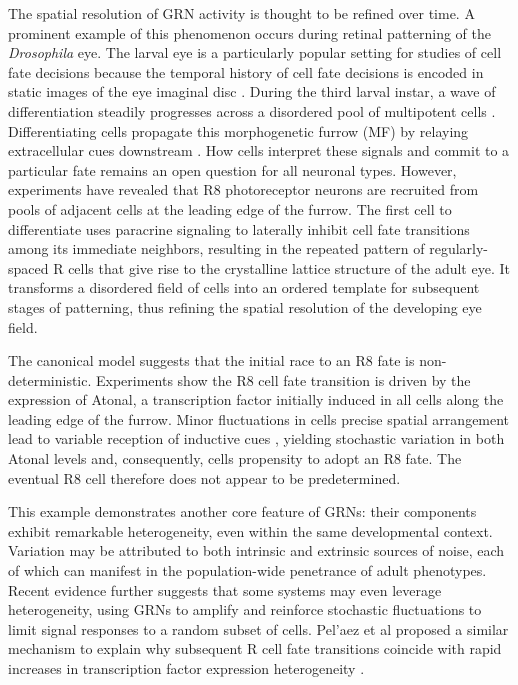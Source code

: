 The spatial resolution of GRN activity is thought to be refined over time. A prominent example of this phenomenon occurs during retinal patterning of the \textit{Drosophila} eye. The larval eye is a particularly popular setting for studies of cell fate decisions because the temporal history of cell fate decisions is encoded in static images of the eye imaginal disc \cite{Pelaez2015}. During the third larval instar, a wave of differentiation steadily progresses across a disordered pool of multipotent cells \cite{Ready1976,Tomlinson1987}. Differentiating cells propagate this morphogenetic furrow (MF) by relaying extracellular cues downstream \cite{Lubensky2011}. How cells interpret these signals and commit to a particular fate remains an open question for all neuronal types. However, experiments have revealed that R8 photoreceptor neurons are recruited from pools of adjacent cells at the leading edge of the furrow. The first cell to differentiate uses paracrine signaling to laterally inhibit cell fate transitions among its immediate neighbors, resulting in the repeated pattern of regularly-spaced R cells that give rise to the crystalline lattice structure of the adult eye. It transforms a disordered field of cells into an ordered template for subsequent stages of patterning, thus refining the spatial resolution of the developing eye field.

The canonical model suggests that the initial race to an R8 fate is non-deterministic. Experiments show the R8 cell fate transition is driven by the expression of Atonal, a transcription factor initially induced in all cells along the leading edge of the furrow. Minor fluctuations in cells precise spatial arrangement lead to variable reception of inductive cues \cite{}, yielding stochastic variation in both Atonal levels and, consequently, cells propensity to adopt an R8 fate. The eventual R8 cell therefore does not appear to be predetermined.

This example demonstrates another core feature of GRNs: their components exhibit remarkable heterogeneity, even within the same developmental context. Variation may be attributed to both intrinsic and extrinsic sources of noise, each of which can manifest in the population-wide penetrance of adult phenotypes. Recent evidence further suggests that some systems may even leverage heterogeneity, using GRNs to amplify and reinforce stochastic fluctuations to limit signal responses to a random subset of cells. Pel'{a}ez et al proposed a similar mechanism to explain why subsequent R cell fate transitions coincide with rapid increases in transcription factor expression heterogeneity \cite{Pelaez2015}.

